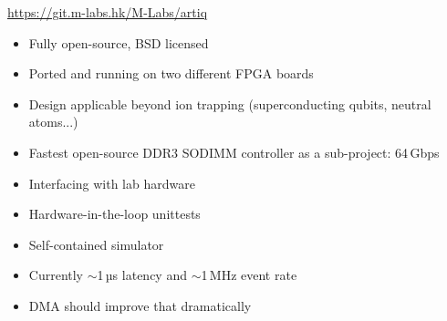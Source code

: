 \documentclass[final,presentation,compress]{beamer}
\begin{document}
\begin{frame}
  \begin{center}
  \url{https://git.m-labs.hk/M-Labs/artiq}
  \end{center}

  \footnotesize
  \begin{itemize}
    \item Fully open-source, BSD licensed
    \item Ported and running on two different FPGA boards
    \item Design applicable beyond ion trapping (superconducting qubits,
      neutral atoms...)
    \item Fastest open-source DDR3 SODIMM controller as a sub-project: 64\,Gbps
    \item Interfacing with lab hardware
    \item Hardware-in-the-loop unittests
    \item Self-contained simulator
    \item Currently $\sim$1\,µs latency and $\sim$1\,MHz event rate
    \item DMA should improve that dramatically
  \end{itemize}

\end{frame}
\end{document}
